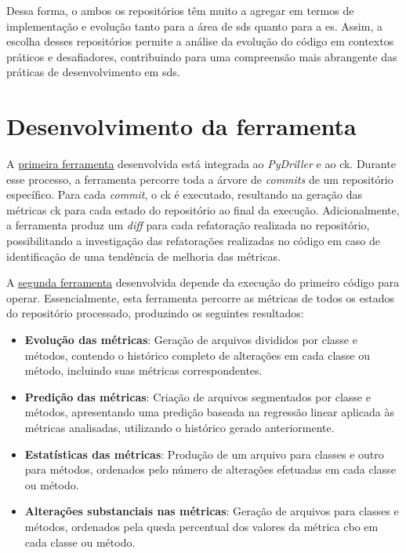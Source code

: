 Dessa forma, o ambos os repositórios têm muito a agregar em termos de implementação e evolução tanto para a área de \gls{sds} quanto para a \gls{es}. Assim, a escolha desses repositórios permite a análise da evolução do código em contextos práticos e desafiadores, contribuindo para uma compreensão mais abrangente das práticas de desenvolvimento em \gls{sds}.

\section{Desenvolvimento da ferramenta}
A \href{https://github.com/BrenoFariasdaSilva/Scientific-Research/blob/main/PyDriller/metrics_changes.py}{primeira ferramenta} desenvolvida está integrada ao \textit{PyDriller} e ao \gls{ck}. Durante esse processo, a ferramenta percorre toda a árvore de \textit{commits} de um repositório específico. Para cada \textit{commit}, o \gls{ck} é executado, resultando na geração das métricas \gls{ck} para cada estado do repositório ao final da execução. Adicionalmente, a ferramenta produz um \textit{diff} para cada refatoração realizada no repositório, possibilitando a investigação das refatorações realizadas no código em caso de identificação de uma tendência de melhoria das métricas.

A \href{https://github.com/BrenoFariasdaSilva/Scientific-Research/blob/main/PyDriller/metrics_changes.py}{segunda ferramenta} desenvolvida depende da execução do primeiro código para operar. Essencialmente, esta ferramenta percorre as métricas de todos os estados do repositório processado, produzindo os seguintes resultados:

\begin{itemize}
    \item \textbf{Evolução das métricas}: Geração de arquivos divididos por classe e métodos, contendo o histórico completo de alterações em cada classe ou método, incluindo suas métricas correspondentes.
    \item \textbf{Predição das métricas}: Criação de arquivos segmentados por classe e métodos, apresentando uma predição baseada na regressão linear aplicada às métricas analisadas, utilizando o histórico gerado anteriormente.
    \item \textbf{Estatísticas das métricas}: Produção de um arquivo para classes e outro para métodos, ordenados pelo número de alterações efetuadas em cada classe ou método.
    \item \textbf{Alterações substanciais nas métricas}: Geração de arquivos para classes e métodos, ordenados pela queda percentual dos valores da métrica \gls{cbo} em cada classe ou método.
\end{itemize}

